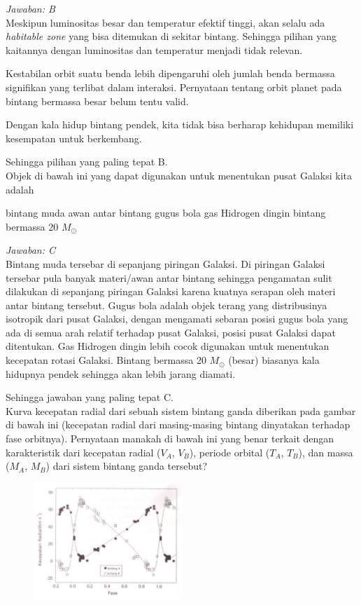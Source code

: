\documentclass[11pt,fleqn]{exam}
\begin{document}
\begin{questions}
\textit{Jawaban: B} \\
Meskipun luminositas besar dan temperatur efektif tinggi, akan selalu ada \textit{habitable zone} yang bisa ditemukan di sekitar bintang. Sehingga pilihan yang kaitannya dengan luminositas dan temperatur menjadi tidak relevan.

Kestabilan orbit suatu benda lebih dipengaruhi oleh jumlah benda bermassa signifikan yang terlibat dalam interaksi. Pernyataan tentang orbit planet pada bintang bermassa besar belum tentu valid.

Dengan kala hidup bintang pendek, kita tidak bisa berharap kehidupan memiliki kesempatan untuk berkembang.

Sehingga pilihan yang paling tepat B.\\

\vspace{0.3cm}
\question Objek di bawah ini yang dapat digunakan untuk menentukan pusat Galaksi kita adalah
\begin{choices}
\choice bintang muda
\choice awan antar bintang
\choice gugus bola
\choice gas Hidrogen dingin
\choice bintang bermassa 20 $M_{\odot}$
\end{choices}

\textit{Jawaban: C} \\
Bintang muda tersebar di sepanjang piringan Galaksi. Di piringan Galaksi tersebar pula banyak materi/awan antar bintang sehingga pengamatan sulit dilakukan di sepanjang piringan Galaksi karena kuatnya serapan oleh materi antar bintang tersebut. Gugus bola adalah objek terang yang distribusinya isotropik dari pusat Galaksi, dengan mengamati sebaran posisi gugus bola yang ada di semua arah relatif terhadap pusat Galaksi, posisi pusat Galaksi dapat ditentukan. Gas Hidrogen dingin lebih cocok digunakan untuk menentukan kecepatan rotasi Galaksi. Bintang bermassa 20 $M_{\odot}$ (besar) biasanya kala hidupnya pendek sehingga akan lebih jarang diamati.

Sehingga jawaban yang paling tepat C.\\

\vspace{0.3cm}
\question Kurva kecepatan radial dari sebuah sistem bintang ganda diberikan pada gambar di bawah ini (kecepatan radial dari masing-masing bintang dinyatakan terhadap fase orbitnya). Pernyataan manakah di bawah ini yang benar terkait dengan karakteristik dari kecepatan radial ($V_A$, $V_B$), periode orbital ($T_A$, $T_B$), dan massa ($M_A$, $M_B$) dari sistem bintang ganda tersebut?
\begin{figure}[h!]
\centering
\includegraphics[width=0.5\textwidth]{no6.png}
\end{figure}


\end{questions}
\end{document}
